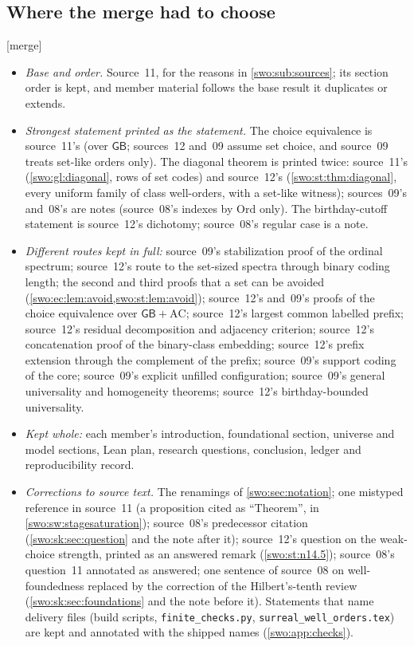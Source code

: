 \documentclass[11pt]{article}
\theoremstyle{definition}
\theoremstyle{remark}
\newcommand{\Ord}{\mathrm{Ord}}
\newcommand{\GB}{\mathsf{GB}}
\newcommand{\code}[1]{\texttt{\small #1}}
\newcommand{\merge}{\textsf{[merge]}}
\begin{document}
\subsection{Where the merge had to choose}\label{swo:sub:choices}

\merge
\begin{itemize}
\item \emph{Base and order.} Source~11, for the reasons in
\cref{swo:sub:sources}; its section order is kept, and member material
follows the base result it duplicates or extends.
\item \emph{Strongest statement printed as the statement.} The choice
equivalence is source~11's (over $\GB$; sources~12 and~09 assume set choice,
and source~09 treats set-like orders only). The diagonal theorem is printed
twice: source~11's (\cref{swo:gl:diagonal}, rows of set codes) and
source~12's (\cref{swo:st:thm:diagonal}, every uniform family of class
well-orders, with a set-like witness); sources~09's and~08's are notes
(source~08's indexes by $\Ord$ only). The birthday-cutoff statement is
source~12's dichotomy; source~08's regular case is a note.
\item \emph{Different routes kept in full:} source~09's stabilization proof
of the ordinal spectrum; source~12's route to the set-sized spectra through
binary coding length; the second and third proofs that a set can be avoided
(\cref{swo:ec:lem:avoid,swo:st:lem:avoid}); source~12's and~09's proofs of
the choice equivalence over $\GB+\mathrm{AC}$; source~12's largest common
labelled prefix; source~12's residual decomposition and adjacency criterion;
source~12's concatenation proof of the binary-class embedding; source~12's
prefix extension through the complement of the prefix; source~09's support
coding of the core; source~09's explicit unfilled configuration;
source~09's general universality and homogeneity theorems; source~12's
birthday-bounded universality.
\item \emph{Kept whole:} each member's introduction, foundational section,
universe and model sections, Lean plan, research questions, conclusion,
ledger and reproducibility record.
\item \emph{Corrections to source text.} The renamings of
\cref{swo:sec:notation}; one mistyped reference in source~11 (a proposition
cited as ``Theorem'', in \cref{swo:sw:stagesaturation}); source~08's
predecessor citation (\cref{swo:sk:sec:question} and the note after it);
source~12's question on the weak-choice strength, printed as an answered
remark (\cref{swo:st:n14.5}); source~08's question~11 annotated as answered;
one sentence of source~08 on well-foundedness replaced by the correction of
the Hilbert's-tenth review (\cref{swo:sk:sec:foundations} and the note before
it).
Statements that name delivery files (build scripts, \code{finite\_checks.py},
\code{surreal\_well\_orders.tex}) are kept and annotated with the shipped
names (\cref{swo:app:checks}).
\end{itemize}
\end{document}
